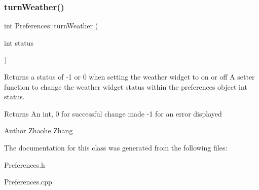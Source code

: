 \subsubsection{\texorpdfstring{turn\+Weather()}{turnWeather()}}
{\footnotesize\ttfamily int Preferences\+::turn\+Weather (\begin{DoxyParamCaption}\item[{int}]{status }\end{DoxyParamCaption})}



Returns a status of -\/1 or 0 when setting the weather widget to on or off  A setter function to change the weather widget status within the preferences object  int status. 

\begin{DoxyReturn}{Returns}
An int, 0 for successful change made -\/1 for an error displayed 
\end{DoxyReturn}
\begin{DoxyAuthor}{Author}
Zhaohe Zhang 
\end{DoxyAuthor}


The documentation for this class was generated from the following files\+:\begin{DoxyCompactItemize}
\item 
Preferences.\+h\item 
Preferences.\+cpp\end{DoxyCompactItemize}
